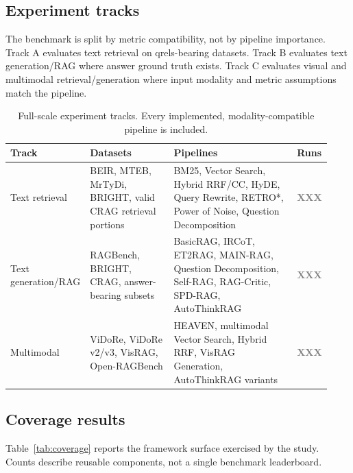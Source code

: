 \documentclass{article}
\newcommand{\res}[1][XX.X]{\textcolor{gray}{\textbf{#1}}}
\begin{document}
\subsection{Experiment tracks}

The benchmark is split by metric compatibility, not by pipeline importance. Track A evaluates text retrieval on qrels-bearing datasets. Track B evaluates text generation/RAG where answer ground truth exists. Track C evaluates visual and multimodal retrieval/generation where input modality and metric assumptions match the pipeline.

\begin{table}[H]
\centering
\caption{Full-scale experiment tracks. Every implemented, modality-compatible pipeline is included.}
\label{tab:tracks}
\small
\setlength{\tabcolsep}{3pt}
\begin{tabular}{@{}L{0.15\linewidth}L{0.28\linewidth}L{0.42\linewidth}L{0.08\linewidth}@{}}
\toprule
Track & Datasets & Pipelines & Runs \\
\midrule
Text retrieval & BEIR, MTEB, MrTyDi, BRIGHT, valid CRAG retrieval portions & BM25, Vector Search, Hybrid RRF/CC, HyDE, Query Rewrite, RETRO*, Power of Noise, Question Decomposition & \res[XXX] \\
Text generation/RAG & RAGBench, BRIGHT, CRAG, answer-bearing subsets & BasicRAG, IRCoT, ET2RAG, MAIN-RAG, Question Decomposition, Self-RAG, RAG-Critic, SPD-RAG, AutoThinkRAG & \res[XXX] \\
Multimodal & ViDoRe, ViDoRe v2/v3, VisRAG, Open-RAGBench & HEAVEN, multimodal Vector Search, Hybrid RRF, VisRAG Generation, AutoThinkRAG variants & \res[XXX] \\
\bottomrule
\end{tabular}
\end{table}

\subsection{Coverage results}

Table~\ref{tab:coverage} reports the framework surface exercised by the study. Counts describe reusable components, not a single benchmark leaderboard.
\end{document}
